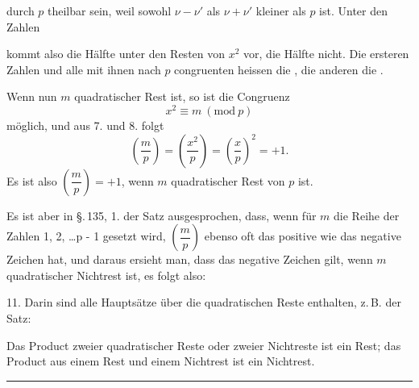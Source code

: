 durch $p$ theilbar sein, weil sowohl $\nu - \nu'$ als $\nu + \nu'$ kleiner als
$p$ ist. Unter den Zahlen


kommt also die H\"alfte unter den Resten von $x^2$ vor, die H\"alfte
nicht. Die ersteren Zahlen und alle mit ihnen nach $p$ congruenten
heissen die , die anderen die
.

Wenn nun $m$ quadratischer Rest ist, so ist die Congruenz
\[
x^2 \equiv m \ (\mathrm{mod}\ p)
\]
m\"oglich, und aus 7. und 8. folgt
\[
\left(\frac{m}{p}\right) = \left(\frac{x^2}{p}\right) = \left(\frac{x}{p}\right)^2 = +1.
\]
Es ist also $\left(\dfrac{m}{p}\right) = +1$, wenn $m$ quadratischer Rest von
$p$ ist.

Es ist aber in \S.\,135, 1. der Satz ausgesprochen, dass, wenn
f\"ur $m$ die Reihe der Zahlen 1, 2, \ldots p - 1 gesetzt wird,
$\left(\dfrac{m}{p}\right)$ ebenso oft das positive wie das negative
Zeichen hat, und daraus ersieht man, dass das negative Zeichen gilt,
wenn $m$ quadratischer Nichtrest ist, es folgt also:

11. 
Darin sind alle Haupts\"atze \"uber die quadratischen Reste
enthalten, z.\,B. der Satz:

Das Product zweier quadratischer Reste oder zweier Nichtreste
ist ein Rest; das Product aus einem Rest und einem Nichtrest ist
ein Nichtrest.

\begin{center}
\rule{0.25\linewidth}{0.4pt}
\end{center}
